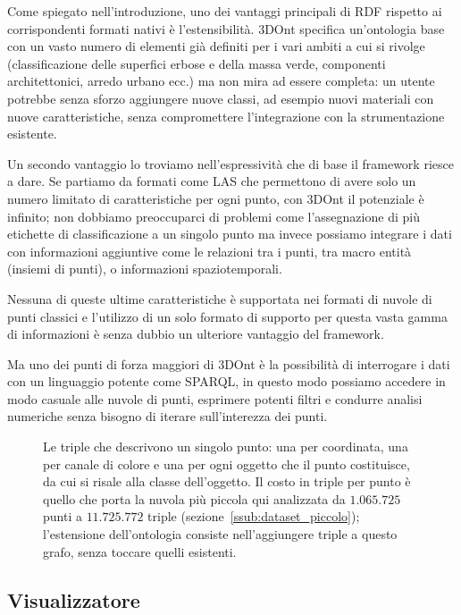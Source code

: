 Come spiegato nell'introduzione, uno dei vantaggi principali di RDF rispetto ai corrispondenti formati nativi è l'estensibilità.
3DOnt specifica un'ontologia base con un vasto numero di elementi già definiti per i vari ambiti a cui si rivolge (classificazione
delle superfici erbose e della massa verde, componenti architettonici, arredo urbano ecc.) ma non mira ad essere completa: un utente
potrebbe senza sforzo aggiungere nuove classi, ad esempio nuovi materiali con nuove caratteristiche, senza compromettere l'integrazione
con la strumentazione esistente.
\par Un secondo vantaggio lo troviamo nell'espressività che di base il framework riesce a dare. Se partiamo da formati come LAS che
permettono di avere solo un numero limitato di caratteristiche per ogni punto, con 3DOnt il potenziale è infinito; non dobbiamo
preoccuparci di problemi come l'assegnazione di più etichette di classificazione a un singolo punto ma invece possiamo integrare i
dati con informazioni aggiuntive come le relazioni tra i punti, tra macro entità (insiemi di punti), o informazioni spaziotemporali.
\par Nessuna di queste ultime caratteristiche è supportata nei formati di nuvole di punti classici e l'utilizzo di un solo formato
di supporto per questa vasta gamma di informazioni è senza dubbio un ulteriore vantaggio del framework.
\par Ma uno dei punti di forza maggiori di 3DOnt è la possibilità di interrogare i dati con un linguaggio potente come SPARQL,
in questo modo possiamo accedere in modo casuale alle nuvole di punti, esprimere potenti filtri e condurre analisi numeriche
senza bisogno di iterare sull'interezza dei punti.

\begin{figure}[htb]
  \centering
  
  \caption{Le triple che descrivono un singolo punto: una per coordinata, una per canale di colore e una per ogni oggetto che il punto costituisce, da cui si risale alla classe dell'oggetto. Il costo in triple per punto è quello che porta la nuvola più piccola qui analizzata da $1.065.725$ punti a $11.725.772$ triple (sezione~\ref{ssub:dataset_piccolo}); l'estensione dell'ontologia consiste nell'aggiungere triple a questo grafo, senza toccare quelli esistenti.}
  \label{fig:punto_rdf}
\end{figure}

\subsection{Visualizzatore}
\label{subsec:visualizer}

